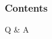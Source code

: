 \documentclass[aspectratio=169]{beamer}
\title[\tc]{\deliv{\imp}{Part 1: Presentation}}
\date{\dateimpone}
\begin{document}

\begin{frame}
\maketitle
\begin{center}
\names
\end{center}
\end{frame}

\begin{frame}
\frametitle{Contents}
\setlength{\columnsep}{0.11in}
\tableofcontents
\end{frame}



% 



\begin{frame}
Q \& A
\end{frame}

\end{document}
